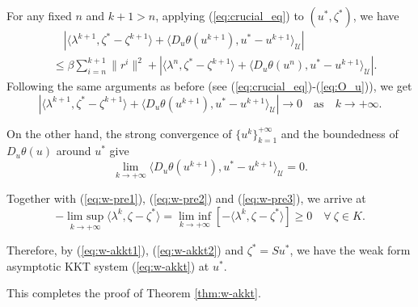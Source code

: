 \documentclass[leqno]{amsart}
\DeclareMathOperator*\lowlim{lim\ inf}
\DeclareMathOperator*\uplim{lim\ sup}
\theoremstyle{definition}
\begin{document}
For any fixed $n$  and $k + 1>n$, applying (\ref{eq:crucial_eq}) to $(u^*, \zeta^*)$, we have 
\begin{equation}\nonumber
\begin{aligned}
&\quad |\langle \lambda^{k+1}, \zeta^* - \zeta^{k+1}\rangle + \langle D_u\theta(u^{k+1}), u^* - u^{k+1} \rangle_\mathcal{U}| \\
& \leq \beta\sum\limits_{i = n}^{k+1}\|r^{i}\|^2 + |\langle \lambda^n, \zeta^* - \zeta^{k+1}\rangle + \langle D_u\theta(u^n), u^* - u^{k+1} \rangle_\mathcal{U}|.
\end{aligned}
\end{equation}
Following the same arguments as before (see (\ref{eq:crucial_eq})-(\ref{eq:O_u})), we get
\begin{equation}\label{eq:w-pre2}
|\langle \lambda^{k+1}, \zeta^* - \zeta^{k+1}\rangle + \langle D_u\theta(u^{k+1}), u^* - u^{k+1} \rangle_\mathcal{U}| \rightarrow 0\quad \mbox{as}\quad k\rightarrow +\infty.
\end{equation}

On the other hand, the strong convergence of $\{u^{k}\}_{k=1}^{+\infty}$ and the boundedness of $D_u\theta(u)$ around $u^*$ give
\begin{equation}\label{eq:w-pre3}
\lim\limits_{k\rightarrow +\infty}\langle D_u\theta(u^{k+1}), u^* - u^{k+1} \rangle_\mathcal{U} = 0.
\end{equation}

Together with (\ref{eq:w-pre1}), (\ref{eq:w-pre2}) and (\ref{eq:w-pre3}), we arrive at 
\begin{equation}\label{eq:w-akkt2}
-\uplim\limits_{k\rightarrow + \infty}\langle \lambda^k, \zeta - \zeta^*\rangle = \lowlim\limits_{k\rightarrow + \infty}[-\langle \lambda^k, \zeta - \zeta^*\rangle]  \geq 0\quad \forall\ \zeta\in K.
\end{equation}

Therefore, by (\ref{eq:w-akkt1}), (\ref{eq:w-akkt2}) and $\zeta^* = Su^*$, we have the weak form asymptotic KKT system (\ref{eq:w-akkt}) at $u^*$.

This completes the proof of Theorem \ref{thm:w-akkt}.






 \medskip
\end{document}
